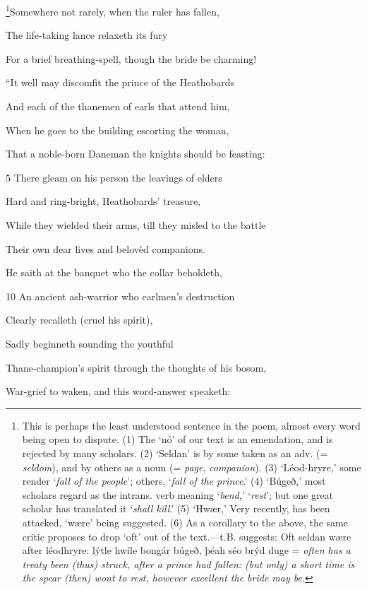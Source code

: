 \footnote{This is perhaps the least understood sentence in the poem, almost every
word being open to dispute. (1) The ‘nó’ of our text is an emendation, and
is rejected by many scholars. (2) ‘Seldan’ is by some taken as an adv.
(= \emph{seldom}), and by others as a noun (= \emph{page}, \emph{companion}). (3) ‘Léod-hryre,’
some render ‘\emph{fall of the people}’; others, ‘\emph{fall of the prince}.’ (4) ‘Búgeð,’
most scholars regard as the intrans. verb meaning ‘\emph{bend},’ ‘\emph{rest}’; but one
great scholar has translated it ‘\emph{shall kill}.’ (5) ‘Hwær,’ Very recently, has
been attacked, ‘wære’ being suggested. (6) As a corollary to the above,
the same critic proposes to drop ‘oft’ out of the text.—t.B. suggests: Oft
seldan wære after léodhryre: lýtle hwíle bongár búgeð, þéah séo brýd duge
= \emph{often has a treaty been (thus) struck, after a prince had fallen: (but only)
a short time is the spear (then) wont to rest, however excellent the bride may be}.}Somewhere not rarely, when the ruler has fallen,

The life-taking lance relaxeth its fury

For a brief breathing-spell, though the bride be charming!



“It well may discomfit the prince of the Heathobards

And each of the thanemen of earls that attend him,

When he goes to the building escorting the woman,

That a noble-born Daneman the knights should be feasting:

5
There gleam on his person the leavings of elders

Hard and ring-bright, Heathobards’ treasure,

While they wielded their arms, till they misled to the battle

Their own dear lives and belovèd companions.

He saith at the banquet who the collar beholdeth,

10
An ancient ash-warrior who earlmen’s destruction

Clearly recalleth (cruel his spirit),

Sadly beginneth sounding the youthful

Thane-champion’s spirit through the thoughts of his bosom,

War-grief to waken, and this word-answer speaketh:

